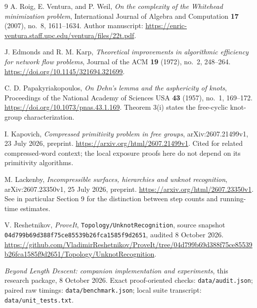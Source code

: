 \documentclass[11pt,letterpaper]{article}
\theoremstyle{definition}\newtheorem{definition}[theorem]{Definition}
\begin{document}
\begin{thebibliography}{9}\small
{}
A. Roig, E. Ventura, and P. Weil,
\emph{On the complexity of the Whitehead minimization problem},
International Journal of Algebra and Computation \textbf{17} (2007), no.~8, 1611--1634.
Author manuscript: \url{https://enric-ventura.staff.upc.edu/ventura/files/22t.pdf}.

J. Edmonds and R. M. Karp,
\emph{Theoretical improvements in algorithmic efficiency for network flow problems},
Journal of the ACM \textbf{19} (1972), no.~2, 248--264.
\url{https://doi.org/10.1145/321694.321699}.

C. D. Papakyriakopoulos,
\emph{On Dehn's lemma and the asphericity of knots},
Proceedings of the National Academy of Sciences USA \textbf{43} (1957), no.~1, 169--172.
\url{https://doi.org/10.1073/pnas.43.1.169}.
Theorem 3(i) states the free-cyclic knot-group characterization.

I. Kapovich,
\emph{Compressed primitivity problem in free groups},
arXiv:2607.21499v1, 23 July 2026, preprint.
\url{https://arxiv.org/html/2607.21499v1}.
Cited for related compressed-word context; the local exposure proofs here do not depend on its primitivity algorithms.

M. Lackenby,
\emph{Incompressible surfaces, hierarchies and unknot recognition},
arXiv:2607.23350v1, 25 July 2026, preprint.
\url{https://arxiv.org/html/2607.23350v1}.
See in particular Section 9 for the distinction between step counts and running-time estimates.

V. Reshetnikov, \emph{ProveIt},
\texttt{Topology/UnknotRecognition}, source snapshot
\texttt{04d799b69d388f75ce85539b26fca1585f9d2651}, audited 8 October 2026.
\url{https://github.com/VladimirReshetnikov/ProveIt/tree/04d799b69d388f75ce85539b26fca1585f9d2651/Topology/UnknotRecognition}.

\emph{Beyond Length Descent: companion implementation and experiments},
this research package, 8 October 2026.
Exact proof-oriented checks: \texttt{data/audit.json}; paired raw timings:
\texttt{data/benchmark.json}; local suite transcript: \texttt{data/unit\_tests.txt}.
\end{thebibliography}
\end{document}
